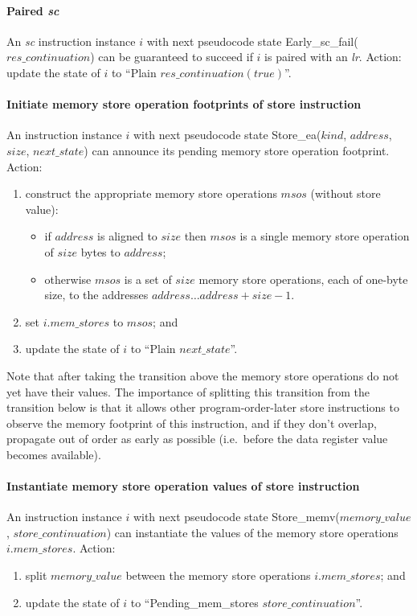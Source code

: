 \paragraph{Paired {\em sc}}\label{omm:paired_sc}
An {\em sc} instruction instance $i$ with next pseudocode state {\sc Early\_sc\_fail}($res\_continuation$) can be guaranteed to succeed if $i$ is paired with an {\em lr}.
Action: update the state of $i$ to ``{\sc Plain} $res\_continuation(true)$''.


\paragraph{Initiate memory store operation footprints of store instruction}\label{omm:initiate_store_footprint}
An instruction instance $i$ with next pseudocode state {\sc Store\_ea}($kind$, $address$, $size$, $next\_state$) can announce its pending memory store operation footprint.
Action:
\begin{enumerate}
\item construct the appropriate memory store operations $msos$ (without store value):
  \begin{itemize}
  \item if $address$ is aligned to $size$ then $msos$ is a single memory store operation of $size$ bytes to $address$;
  \item otherwise $msos$ is a set of $size$ memory store operations, each of one-byte size, to the addresses $address\ldots address+size-1$.
  \end{itemize}
\item set $i.mem\_stores$ to $msos$; and
\item update the state of $i$ to ``{\sc Plain} $next\_state$''.
\end{enumerate}

\begin{commentary}
Note that after taking the transition above the memory store operations do not yet have their values.
The importance of splitting this transition from the transition below is that it allows other program-order-later store instructions to observe the memory footprint of this instruction, and if they don't overlap, propagate out of order as early as possible (i.e.~before the data register value becomes available).
\end{commentary}


\paragraph{Instantiate memory store operation values of store instruction}\label{omm:instantiate_store_value}
An instruction instance $i$ with next pseudocode state {\sc Store\_memv}($memory\_value$, $store\_continuation$) can instantiate the values of the memory store operations $i.mem\_stores$.
Action:
\begin{enumerate}
\item split $memory\_value$ between the memory store operations $i.mem\_stores$; and
\item update the state of $i$ to ``{\sc Pending\_mem\_stores} $store\_continuation$''.
\end{enumerate}



